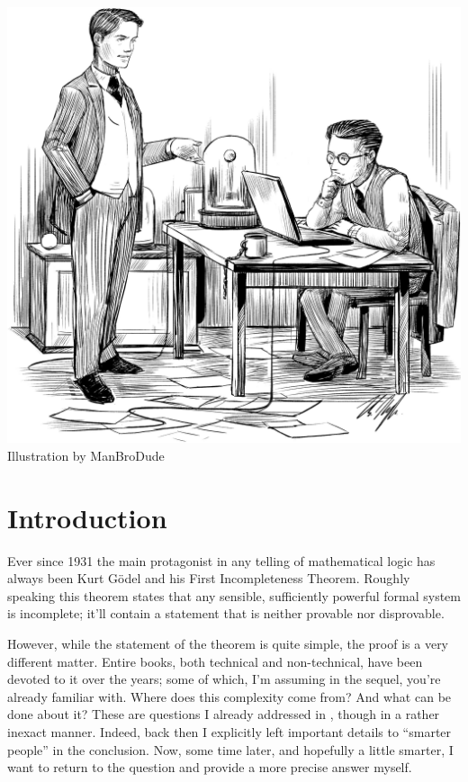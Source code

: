 \documentclass{article}
\theoremstyle{customstyle}
\begin{document}
\begin{center}
  \includegraphics[scale=0.115]{cover.jpg}
  \newline
  \footnotesize{Illustration by ManBroDude}
\end{center}

\section{Introduction}

Ever since 1931 the main protagonist in any telling of mathematical logic has always been Kurt Gödel and his First Incompleteness Theorem. Roughly speaking this theorem states that any sensible, sufficiently powerful formal system is incomplete; it'll contain a statement that is neither provable nor disprovable.

However, while the statement of the theorem is quite simple, the proof is a very different matter. Entire books, both technical and non-technical, have been devoted to it over the years; some of which, I'm assuming in the sequel, you're already familiar with. Where does this complexity come from? And what can be done about it? These are questions I already addressed in \cite{oberhoff}, though in a rather inexact manner. Indeed, back then I explicitly left important details to ``smarter people'' in the conclusion. Now, some time later, and hopefully a little smarter, I want to return to the question and provide a more precise answer myself.
\end{document}
